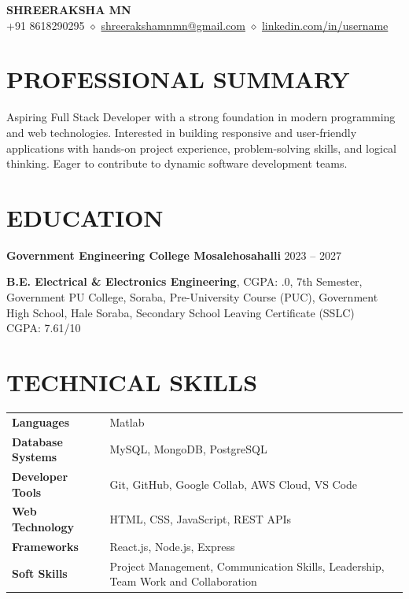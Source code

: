 \documentclass[9.5pt,a4paper]{extarticle}
\begin{document}
\begin{center}
{\Large \textbf{SHREERAKSHA MN}} \\ \vspace{2pt}
+91 8618290295 $\diamond$ \href{mailto:shreerakshamnmn@gmail.com}{shreerakshamnmn@gmail.com} $\diamond$ \href{https://linkedin.com/in/username}{linkedin.com/in/username}
\end{center}

\section*{PROFESSIONAL SUMMARY}
Aspiring Full Stack Developer with a strong foundation in modern programming and web technologies. Interested in building responsive and user-friendly applications with hands-on project experience, problem-solving skills, and logical thinking. Eager to contribute to dynamic software development teams.

\section*{EDUCATION}
\noindent \textbf{Government Engineering College Mosalehosahalli} \hfill 2023 – 2027 \\ \vspace{4pt}

\noindent \textbf{B.E. Electrical \& Electronics Engineering}, CGPA: .0, 7th Semester, Government PU College, Soraba, Pre-University Course (PUC), Government High School, Hale Soraba, Secondary School Leaving Certificate (SSLC) \\
\null \hfill CGPA: 7.61/10 \vspace{4pt}


\section*{TECHNICAL SKILLS}
\begin{tabular}{@{}p{1.5in}p{5.4in}@{}}
\textbf{Languages} & Matlab \\
\textbf{Database Systems} & MySQL, MongoDB, PostgreSQL \\
\textbf{Developer Tools} & Git, GitHub, Google Collab, AWS Cloud, VS Code \\
\textbf{Web Technology} & HTML, CSS, JavaScript, REST APIs \\
\textbf{Frameworks} & React.js, Node.js, Express \\
\textbf{Soft Skills} & Project Management, Communication Skills, Leadership, Team Work and Collaboration \\
\end{tabular}
\end{document}
